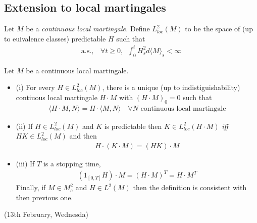 \documentclass[12pt,a4paper]{article}
\renewenvironment{i}
{\begin{itemize} 
	}%
	{\end{itemize}
}
\begin{document}
\subsection{Extension to local martingales}

 Let $M$ be a \emph{continuous local martingale.} Define $L_{loc}^2(M)$ to be the space of (up to euivalence classes) predictable $H$ such that
\begin{align*}
\text{a.s.,} \quad \forall t\geq 0,\,\,\, \int_0^t H_s^2 d \langle M \rangle_s < \infty 
\end{align*}
\s

\thm Let $M$ be a continuous local martingale.
\begin{i}
\item[(i)] For every $H \in L^2_{loc}(M)$, there is a unique (up to indistiguishability) contiuous local martingale $H\cdot M$ with $(H\cdot M)_0 =0$ such that
\begin{align*}
\langle H \cdot M, N \rangle = H \cdot \langle M, N\rangle \quad \forall N \text{ continuous local martingale}
\end{align*}
\item[(ii)] If $H\in L_{loc}^2(M)$ and $K$ is predictable then $K\in L^2_{loc}(H \cdot M)$ \emph{iff} $HK\in L^2_{loc}(M)$ and then
\begin{align*}
H \cdot (K \cdot M) = (HK) \cdot M
\end{align*}
\item[(iii)] If $T$ is a stopping time,
\begin{align*}
(1_{[0, T]} H)\cdot M = (H \cdot M)^T = H\cdot M^T
\end{align*}
Finally, if $M\in M^2_c$ and $H\in L^2(M)$ then the definition is consistent with then previous one. 
\end{i}
\s

\newday

(13th February, Wednesda)
\s
\end{document}
